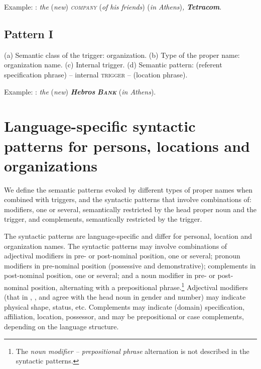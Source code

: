 \documentclass[output=paper]{langsci/langscibook}
\newcommand{\trigger}[1]{\textsc{#1}}
\begin{document}
\medskip 

Example: :\textit{ the }(\textit{new})\textit{
}\textit{\trigger{company}}\textit{ }(\textit{of his friends})
(\textit{in Athens})\textit{,} \textbf{\textit{Tetracom}}.
 
\subsection{Pattern I}

(a) Semantic class of the trigger: organization. (b) Type of the proper
name: organization name. (c) Internal trigger. (d) Semantic pattern:
(referent specification phrase) – internal \trigger{trigger} – (location
phrase).


\medskip 

Example: : \textit{the }(\textit{new}) \textbf{\textit{Hebros}}
\textbf{\textit{\trigger{Bank}}} (\textit{in Athens}).




\section{Language-specific syntactic patterns for persons, locations and organizations}



We define the semantic patterns evoked by different types of proper
names when combined with triggers, and the syntactic patterns that
involve combinations of: modifiers, one or several, semantically
restricted by the head proper noun and the trigger, and complements,
semantically restricted by the trigger.

The syntactic patterns  are language-specific and differ for personal,
location and organization names. The syntactic patterns may involve
combinations of adjectival modifiers in pre- or post-nominal position,
one or several; pronoun modifiers in pre-nominal position (possessive
and demonstrative); complements in post-nominal position, one or
several; and a noun modifier in pre- or post-nominal position,
alternating with a prepositional
phrase.\footnote{The \textit{noun modifier – prepositional phrase} alternation
is not described in the syntactic patterns.} Adjectival modifiers (that in ,
,  and  agree with the head noun in gender and
number) may indicate physical shape, status, etc. Complements may
indicate (domain) specification, affiliation, location, possessor, and
may be prepositional or case complements, depending on the language
structure.
\end{document}
